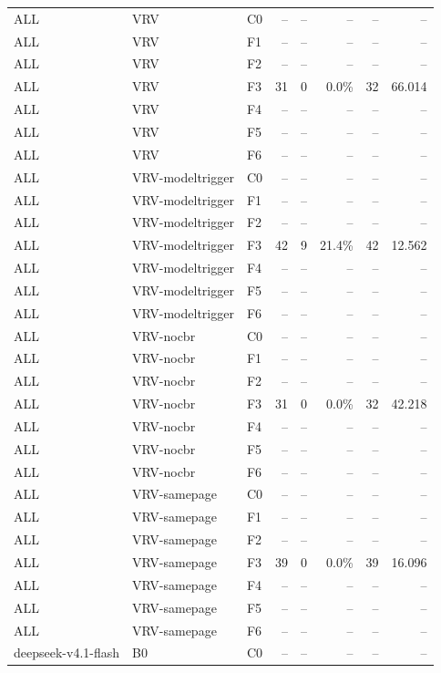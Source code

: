 \begin{tabular}{lllrrrrr}
ALL & VRV & C0 & -- & -- & -- & -- & -- \\
ALL & VRV & F1 & -- & -- & -- & -- & -- \\
ALL & VRV & F2 & -- & -- & -- & -- & -- \\
ALL & VRV & F3 & 31 & 0 & 0.0\% & 32 & 66.014 \\
ALL & VRV & F4 & -- & -- & -- & -- & -- \\
ALL & VRV & F5 & -- & -- & -- & -- & -- \\
ALL & VRV & F6 & -- & -- & -- & -- & -- \\
ALL & VRV-modeltrigger & C0 & -- & -- & -- & -- & -- \\
ALL & VRV-modeltrigger & F1 & -- & -- & -- & -- & -- \\
ALL & VRV-modeltrigger & F2 & -- & -- & -- & -- & -- \\
ALL & VRV-modeltrigger & F3 & 42 & 9 & 21.4\% & 42 & 12.562 \\
ALL & VRV-modeltrigger & F4 & -- & -- & -- & -- & -- \\
ALL & VRV-modeltrigger & F5 & -- & -- & -- & -- & -- \\
ALL & VRV-modeltrigger & F6 & -- & -- & -- & -- & -- \\
ALL & VRV-nocbr & C0 & -- & -- & -- & -- & -- \\
ALL & VRV-nocbr & F1 & -- & -- & -- & -- & -- \\
ALL & VRV-nocbr & F2 & -- & -- & -- & -- & -- \\
ALL & VRV-nocbr & F3 & 31 & 0 & 0.0\% & 32 & 42.218 \\
ALL & VRV-nocbr & F4 & -- & -- & -- & -- & -- \\
ALL & VRV-nocbr & F5 & -- & -- & -- & -- & -- \\
ALL & VRV-nocbr & F6 & -- & -- & -- & -- & -- \\
ALL & VRV-samepage & C0 & -- & -- & -- & -- & -- \\
ALL & VRV-samepage & F1 & -- & -- & -- & -- & -- \\
ALL & VRV-samepage & F2 & -- & -- & -- & -- & -- \\
ALL & VRV-samepage & F3 & 39 & 0 & 0.0\% & 39 & 16.096 \\
ALL & VRV-samepage & F4 & -- & -- & -- & -- & -- \\
ALL & VRV-samepage & F5 & -- & -- & -- & -- & -- \\
ALL & VRV-samepage & F6 & -- & -- & -- & -- & -- \\
deepseek-v4.1-flash & B0 & C0 & -- & -- & -- & -- & -- \\

\end{tabular}
